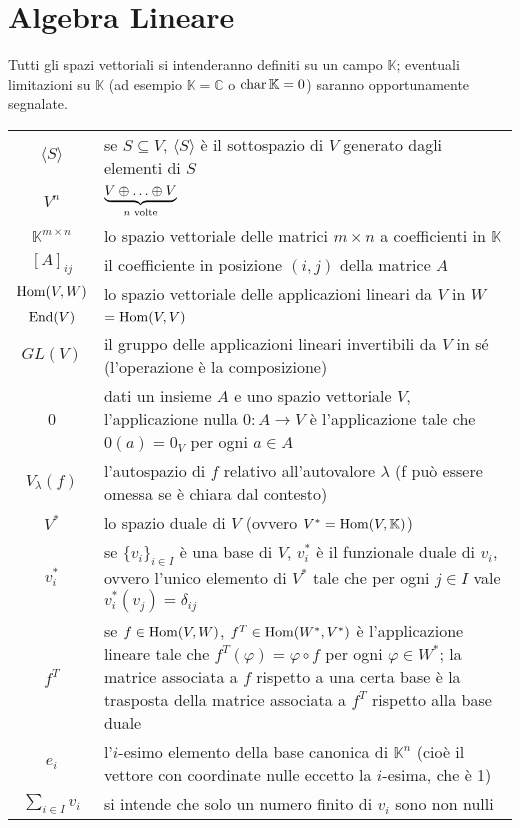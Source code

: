 \section{Algebra Lineare}
Tutti gli spazi vettoriali si intenderanno definiti su un campo $\mathbb{K}$; eventuali limitazioni su $\mathbb{K}$ (ad esempio $\mathbb{K}=\mathbb{C}$ o $\operatorname{char}\mathbb{K}=0$) saranno opportunamente segnalate.\\
\begin{tabularx}{\textwidth}{SX}
\hline
$\langle S\rangle$ & se $S\subseteq V$, $\langle S\rangle$ è il sottospazio di $V$ generato dagli elementi di $S$ \\
$V^n$ & $\underbrace{V\oplus\ldots\oplus V}_\text{$n$ volte}$\\
$\mathbb{K}^{m\times n}$ & lo spazio vettoriale delle matrici $m\times n$ a coefficienti in $\mathbb{K}$\\
$[A]_{ij}$ & il coefficiente in posizione $(i,j)$ della matrice $A$\\
$\operatorname{Hom}(V,W)$ & lo spazio vettoriale delle applicazioni lineari da $V$ in $W$\\
$\operatorname{End}(V)$ & $=\operatorname{Hom}(V,V)$ \\
$GL(V)$ & il gruppo delle applicazioni lineari invertibili da $V$ in sé (l'operazione è la composizione) \\
0 & dati un insieme $A$ e uno spazio vettoriale $V$, l'applicazione nulla $0:A\to V$ è l'applicazione tale che $0(a)=0_V$ per ogni $a\in A$ \\
$V_\lambda(f)$ & l'autospazio di $f$ relativo all'autovalore $\lambda$ (f può essere omessa se è chiara dal contesto)\\
$V^*$ & lo spazio duale di $V$ (ovvero $V^*=\operatorname{Hom}(V,\mathbb{K})$) \\
$v_i^*$ & se $\{v_i\}_{i\in I}$ è una base di $V$, $v_i^*$ è il funzionale duale di $v_i$, ovvero l'unico elemento di $V^*$ tale che per ogni $j\in I$ vale $v_i^*(v_{j})=\delta_{ij}$\\
$f^T$ & se $f\in\operatorname{Hom}(V,W)$, $f^T\in\operatorname{Hom}(W^*,V^*)$ è l'applicazione lineare tale che $f^T(\varphi)=\varphi\circ f$ per ogni $\varphi\in W^*$; la matrice associata a $f$ rispetto a una certa base è la trasposta della matrice associata a $f^T$ rispetto alla base duale\\
$e_i$ & l'$i$-esimo elemento della base canonica di $\mathbb{K}^n$ (cioè il vettore con coordinate nulle eccetto la $i$-esima, che è 1)\\
$\sum_{i\in I}v_i$ & si intende che solo un numero finito di $v_i$ sono non nulli\\
\hline
\end{tabularx}
